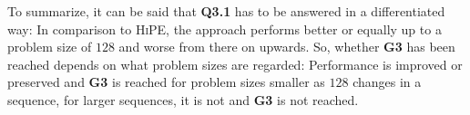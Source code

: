 To summarize, it can be said that \textbf{Q3.1} has to be answered in a differentiated way: In comparison to \textsc{HiPE}, the approach performs better or equally up to a problem size of $128$ and worse from there on upwards. So, whether \textbf{G3} has been reached depends on what problem sizes are regarded: Performance is improved or preserved and \textbf{G3} is reached for problem sizes smaller as $128$ changes in a sequence, for larger sequences, it is not and \textbf{G3} is not reached.

\begin{figure}[h!]
    \centering
\end{figure}
